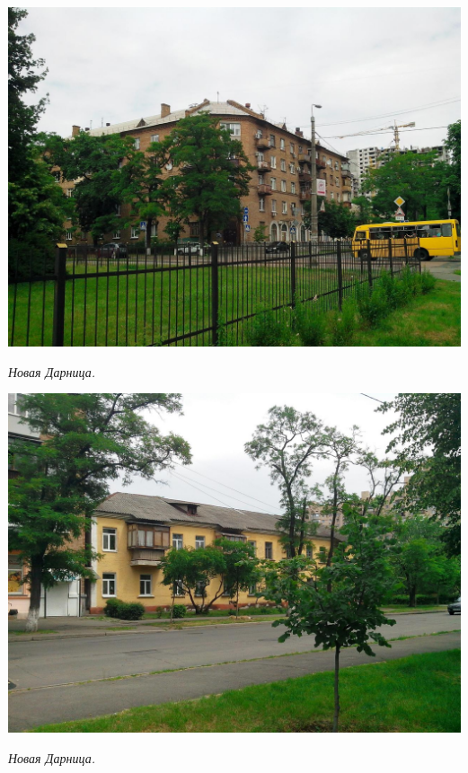\begin{center}
\includegraphics[width=\linewidth]{lpix/IMG_20160613_143111.jpg}

\textit{Новая Дарница.}
\end{center}


\begin{center}
\includegraphics[width=\linewidth]{lpix/IMG_20160613_143139.jpg}

\textit{Новая Дарница.}
\end{center}

